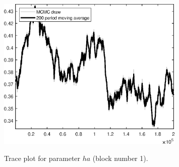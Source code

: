 \begin{figure}[H]
\centering
  \includegraphics[width=0.8\textwidth]{RBC_growth/graphs/TracePlot_ha_blck_1}\\
    \caption{Trace plot for parameter ${ha}$ (block number 1).}
\end{figure}
